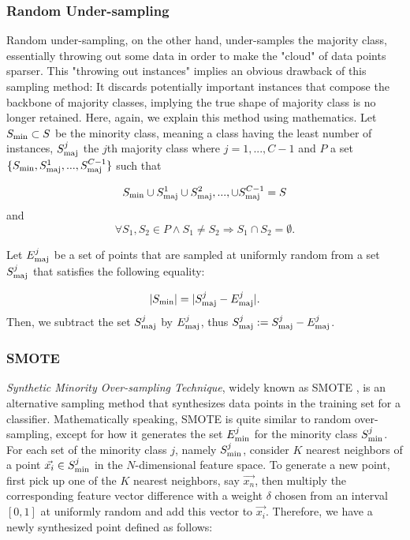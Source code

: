 \documentclass[..]{revtex4}
\begin{document}
	\subsubsection{Random Under-sampling}
	Random under-sampling, on the other hand, under-samples the majority class, essentially throwing out some data in order to make the "cloud" of data points sparser. This "throwing out instances" implies an obvious drawback of this sampling method: It discards potentially important instances that compose the backbone of majority classes, implying the true shape of majority class is no longer retained. Here, again, we explain this method using mathematics. Let $S_{\rm{min}} \subset S$ be the minority class, meaning a class having the least number of instances, $S_{\rm{maj}}^{j}$ the $j$th majority class where $j = 1,...,C-1$ and $P$ a set $\{S_{\rm{min}}, S_{\rm{maj}}^{1},...,S_{\rm{maj}}^{C-1} \}$ such that

	\begin{equation}
	S_{\rm{min}} \cup S_{\rm{maj}}^{1} \cup S_{\rm{maj}}^{2},..., \cup S_{\rm{maj}}^{C-1} = S
	\end{equation}
	and
	\begin{equation}
	\forall S_1,S_2 \in P \land S_1 \neq S_2 \Rightarrow S_1 \cap S_2 = \emptyset.
	\end{equation}
	
Let $E_{\rm{maj}}^j$ be a set of points that are sampled at uniformly random from a set $S_{\rm{maj}}^{j}$ that satisfies the following equality:

	\begin{equation}
	|S_{\rm{min}}| = | S_{\rm{maj}}^j -  E_{\rm{maj}}^j |.
	\end{equation}
Then, we subtract the set $S_{\rm{maj}}^j$ by $E_{\rm{maj}}^j$, thus $S_{\rm{maj}}^j := S_{\rm{maj}}^j -  E_{\rm{maj}}^j$.
		
		\subsubsection{SMOTE}
		\textit{Synthetic Minority Over-sampling Technique}, widely known as SMOTE \cite{SMOTE}, is an alternative sampling method that synthesizes data points in the training set for a classifier. Mathematically speaking, SMOTE is quite similar to random over-sampling, except for how it generates the set $E_{\rm{min}}^j$ for the minority class $S_{\rm{min}}^j$. For each set of the minority class $j$, namely $S_{\rm{min}}^j$, consider $K$ nearest neighbors of a point $\vec{x_i} \in S_{\rm{min}}^j$ in the $N$-dimensional feature space. To generate a new point, first pick up one of the $K$ nearest neighbors, say $\vec{x_{n}}$, then multiply the corresponding feature vector difference with a weight  $\delta$  chosen from an interval $ [0,1]$ at uniformly random and add this vector to $\vec{x_i}$. Therefore, we have a newly synthesized point defined as follows:
		
\end{document}
